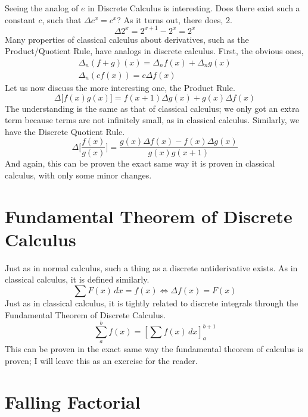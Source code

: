 \documentclass{article}
\begin{document}
Seeing the analog of \(e\) in Discrete Calculus is interesting. Does there exist such a constant \(c\), such that \(\Delta c^x = c^x\)? As it turns out, there does, 2.
\begin{equation}
	\Delta 2^x = 2^{x + 1} - 2^x = 2^x
\end{equation}
Many properties of classical calculus about derivatives, such as the Product/Quotient Rule, have analogs in discrete calculus. First, the obvious ones,
\begin{gather}
	\Delta_n (f + g) (x) = \Delta_n f(x) + \Delta_n g(x) \\
	\Delta_n (cf(x)) = c \Delta f(x)
\end{gather}
Let us now discuss the more interesting one, the Product Rule.
\begin{equation}
	\Delta \biggl[ f(x)g(x) \biggr] = f(x + 1) \Delta g(x) + g(x) \Delta f(x)
\end{equation}
The understanding is the same as that of classical calculus; we only got an extra term because terms are not infinitely small, as in classical calculus. Similarly, we have the Discrete Quotient Rule.
\begin{equation}
	\Delta \biggl[ \frac{f(x)}{g(x)} \biggr] = \frac{g(x) \Delta f(x) - f(x) \Delta g(x)}{g(x) g(x + 1)}
\end{equation}
And again, this can be proven the exact same way it is proven in classical calculus, with only some minor changes.

\section{Fundamental Theorem of Discrete Calculus}
Just as in normal calculus, such a thing as a discrete antiderivative exists. As in classical calculus, it is defined similarly.
\begin{equation}
	\sum F(x) \,dx = f(x) \Leftrightarrow  \Delta f(x) = F(x)
\end{equation}
Just as in classical calculus, it is tightly related to discrete integrals through the Fundamental Theorem of Discrete Calculus.
\begin{equation}
	\sum_{a}^{b} f(x) = \left[ \sum f(x) \,dx \right]^{b + 1}_a
\end{equation}
This can be proven in the exact same way the fundamental theorem of calculus is proven; I will leave this as an exercise for the reader.


\section{Falling Factorial}
\end{document}
